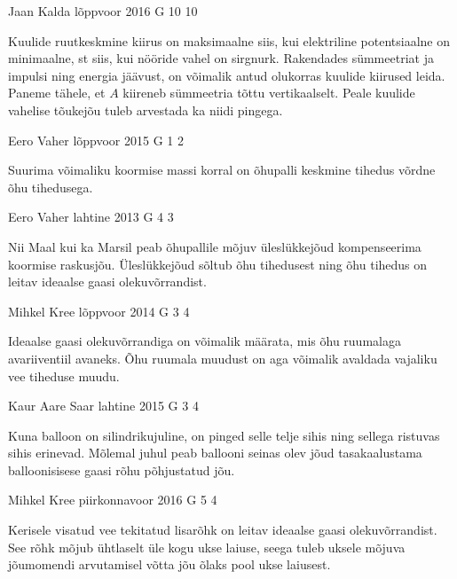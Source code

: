 \documentclass[11pt]{article}
\begin{document}
{%
{Jaan Kalda} %
{lõppvoor} %
{2016} %
{G 10} %
{10} %
{

\ifHint
\osa Kuulide ruutkeskmine kiirus on maksimaalne siis, kui elektriline potentsiaalne on minimaalne, st siis, kui nööride vahel on sirgnurk. Rakendades sümmeetriat ja impulsi ning energia jäävust, on võimalik antud olukorras kuulide kiirused leida.\\
\osa Paneme tähele, et $A$ kiireneb sümmeetria tõttu vertikaalselt. Peale kuulide vahelise tõukejõu tuleb arvestada ka niidi pingega.
\fi
}

{Eero Vaher} %
{lõppvoor} %
{2015} %
{G 1} %
{2} %
{

\ifHint
Suurima võimaliku koormise massi korral on õhupalli keskmine tihedus võrdne õhu tihedusega.
\fi
}

{Eero Vaher} %
{lahtine} %
{2013} %
{G 4} %
{3} %
{

\ifHint
Nii Maal kui ka Marsil peab õhupallile mõjuv üleslükkejõud kompenseerima koormise raskusjõu. Üleslükkejõud sõltub õhu tihedusest ning õhu tihedus on leitav ideaalse gaasi olekuvõrrandist.
\fi
}

{Mihkel Kree} %
{lõppvoor} %
{2014} %
{G 3} %
{4} %
{

\ifHint
Ideaalse gaasi olekuvõrrandiga on võimalik määrata, mis õhu ruumalaga avariiventiil avaneks. Õhu ruumala muudust on aga võimalik avaldada vajaliku vee tiheduse muudu.
\fi
}

{Kaur Aare Saar} %
{lahtine} %
{2015} %
{G 3} %
{4} %
{

\ifHint
Kuna balloon on silindrikujuline, on pinged selle telje sihis ning sellega ristuvas sihis erinevad. Mõlemal juhul peab ballooni seinas olev jõud tasakaalustama balloonisisese gaasi rõhu põhjustatud jõu.
\fi
}

{Mihkel Kree} %
{piirkonnavoor} %
{2016} %
{G 5} %
{4} %
{

\ifHint
Kerisele visatud vee tekitatud lisarõhk on leitav ideaalse gaasi olekuvõrrandist. See rõhk mõjub ühtlaselt üle kogu ukse laiuse, seega tuleb uksele mõjuva jõumomendi arvutamisel võtta jõu õlaks pool ukse laiusest.
\fi
}

}
\end{document}
